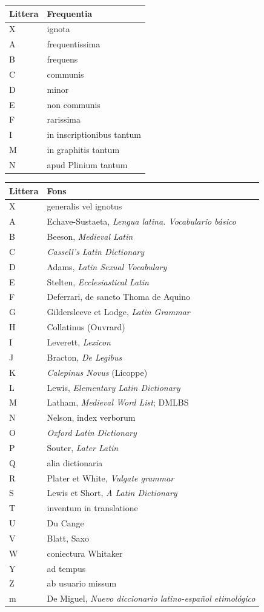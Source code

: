 \documentclass[12pt,
              article,
              oneside
              ]{memoir}
\begin{document}
\begin{longtable}{@{}lp{}@{}}
\toprule
Littera & Frequentia\\
\midrule
\endhead
X & ignota\\
A & frequentissima\\
B & frequens\\
C & communis\\
D & minor\\
E & non communis\\
F & rarissima\\
I & in inscriptionibus tantum\\
M & in graphitis tantum\\
N & apud Plinium tantum\\
\bottomrule
\end{longtable}

\begin{longtable}{@{}lp{}@{}}
\toprule
Littera & Fons\\
\midrule
\endhead
X & generalis vel ignotus\\
A & Echave-Sustaeta, \textit{Lengua latina. Vocabulario básico}\\
B & Beeson, \textit{Medieval Latin}\\
C & \textit{Cassell's Latin Dictionary}\\
D & Adams, \textit{Latin Sexual Vocabulary}\\
E & Stelten, \textit{Ecclesiastical Latin}\\
F & Deferrari, de sancto Thoma de Aquino\\
G & Gildersleeve et Lodge, \textit{Latin Grammar}\\
H & Collatinus (Ouvrard)\\
I & Leverett, \textit{Lexicon}\\
J & Bracton, \textit{De Legibus}\\
K & \textit{Calepinus Novus} (Licoppe)\\
L & Lewis, \textit{Elementary Latin Dictionary}\\
M & Latham, \textit{Medieval Word List}; DMLBS\\
N & Nelson, index verborum\\
O & \textit{Oxford Latin Dictionary}\\
P & Souter, \textit{Later Latin}\\
Q & alia dictionaria\\
R & Plater et White, \textit{Vulgate grammar}\\
S & Lewis et Short, \textit{A Latin Dictionary}\\
T & inventum in translatione\\
U & Du Cange\\
V & Blatt, Saxo\\
W & coniectura Whitaker\\
Y & ad tempus\\
Z & ab usuario missum\\
m & De Miguel, \textit{Nuevo diccionario latino-español etimológico}\\
\bottomrule
\end{longtable}
\end{document}
